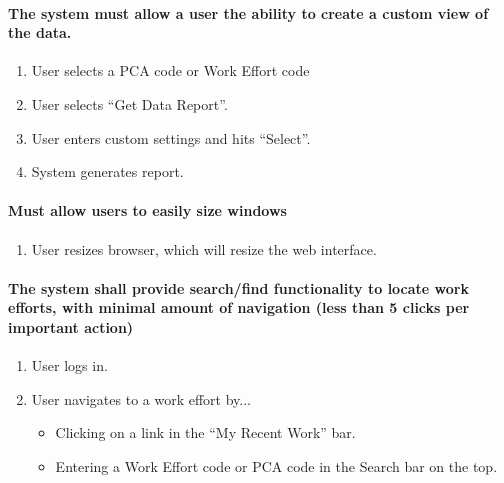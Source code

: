 \documentclass[letterpaper]{article}
\begin{document}
\paragraph{The system must allow a user the ability to create a custom view of the data.}
\begin{enumerate}
\item User selects a PCA code or Work Effort code
\item User selects ``Get Data Report''.
\item User enters custom settings and hits ``Select''.
\item System generates report.
\end{enumerate}

\paragraph{Must allow users to easily size windows}
\begin{enumerate}
\item User resizes browser, which will resize the web interface.
\end{enumerate}

\paragraph{The system shall provide search/find functionality to locate work efforts, with minimal amount of navigation (less than 5 clicks per important action)}
\begin{enumerate}
\item User logs in.
\item User navigates to a work effort by...
\begin{itemize}
  \item Clicking on a link in the ``My Recent Work'' bar.
  \item Entering a Work Effort code or PCA code in the Search bar on the top.
    \end{itemize}
\end{enumerate}
\end{document}
